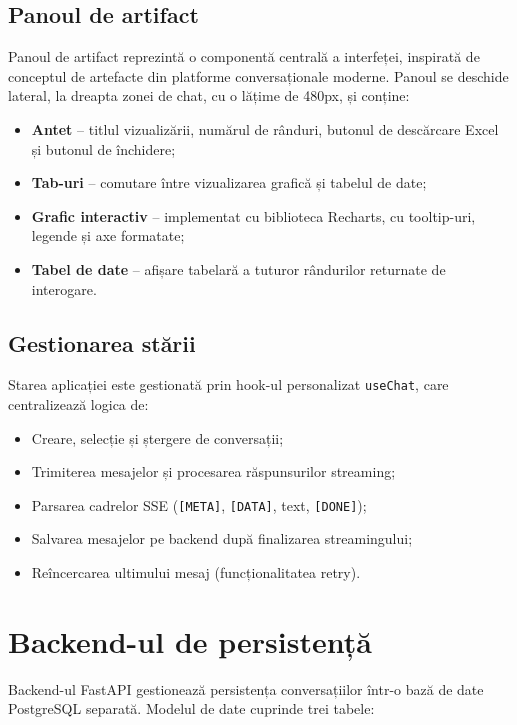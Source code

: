 \documentclass[12pt, a4paper]{report}
\newcommand{\code}[1]{\texttt{#1}}
\begin{document}
\subsection{Panoul de artifact}

Panoul de artifact reprezintă o componentă centrală a interfeței, inspirată de conceptul de artefacte din platforme conversaționale moderne. Panoul se deschide lateral, la dreapta zonei de chat, cu o lățime de 480px, și conține:

\begin{itemize}[nosep]
  \item \textbf{Antet} -- titlul vizualizării, numărul de rânduri, butonul de descărcare Excel și butonul de închidere;
  \item \textbf{Tab-uri} -- comutare între vizualizarea grafică și tabelul de date;
  \item \textbf{Grafic interactiv} -- implementat cu biblioteca Recharts, cu tooltip-uri, legende și axe formatate;
  \item \textbf{Tabel de date} -- afișare tabelară a tuturor rândurilor returnate de interogare.
\end{itemize}

\subsection{Gestionarea stării}

Starea aplicației este gestionată prin hook-ul personalizat \code{useChat}, care centralizează logica de:

\begin{itemize}[nosep]
  \item Creare, selecție și ștergere de conversații;
  \item Trimiterea mesajelor și procesarea răspunsurilor streaming;
  \item Parsarea cadrelor SSE (\code{[META]}, \code{[DATA]}, text, \code{[DONE]});
  \item Salvarea mesajelor pe backend după finalizarea streamingului;
  \item Reîncercarea ultimului mesaj (funcționalitatea retry).
\end{itemize}

\section{Backend-ul de persistență}

Backend-ul FastAPI gestionează persistența conversațiilor într-o bază de date PostgreSQL separată. Modelul de date cuprinde trei tabele:
\end{document}
